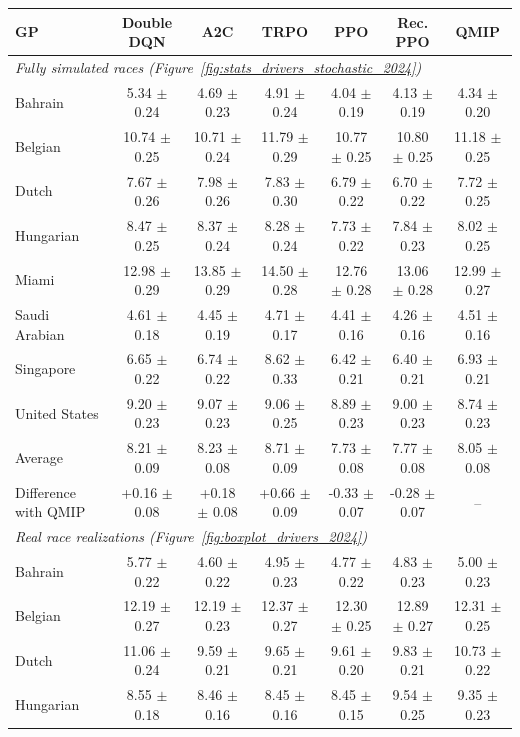 \begin{tabular}{lcccccc}
\toprule
GP & Double DQN & A2C & TRPO & PPO & Rec. PPO & QMIP \\
\midrule
\multicolumn{7}{l}{\textit{Fully simulated races (Figure~\ref{fig:stats_drivers_stochastic_2024})}} \\
\midrule
Bahrain & 5.34 $\pm$ 0.24 & 4.69 $\pm$ 0.23 & 4.91 $\pm$ 0.24 & 4.04 $\pm$ 0.19 & 4.13 $\pm$ 0.19 & 4.34 $\pm$ 0.20 \\
Belgian & 10.74 $\pm$ 0.25 & 10.71 $\pm$ 0.24 & 11.79 $\pm$ 0.29 & 10.77 $\pm$ 0.25 & 10.80 $\pm$ 0.25 & 11.18 $\pm$ 0.25 \\
Dutch & 7.67 $\pm$ 0.26 & 7.98 $\pm$ 0.26 & 7.83 $\pm$ 0.30 & 6.79 $\pm$ 0.22 & 6.70 $\pm$ 0.22 & 7.72 $\pm$ 0.25 \\
Hungarian & 8.47 $\pm$ 0.25 & 8.37 $\pm$ 0.24 & 8.28 $\pm$ 0.24 & 7.73 $\pm$ 0.22 & 7.84 $\pm$ 0.23 & 8.02 $\pm$ 0.25 \\
Miami & 12.98 $\pm$ 0.29 & 13.85 $\pm$ 0.29 & 14.50 $\pm$ 0.28 & 12.76 $\pm$ 0.28 & 13.06 $\pm$ 0.28 & 12.99 $\pm$ 0.27 \\
Saudi Arabian & 4.61 $\pm$ 0.18 & 4.45 $\pm$ 0.19 & 4.71 $\pm$ 0.17 & 4.41 $\pm$ 0.16 & 4.26 $\pm$ 0.16 & 4.51 $\pm$ 0.16 \\
Singapore & 6.65 $\pm$ 0.22 & 6.74 $\pm$ 0.22 & 8.62 $\pm$ 0.33 & 6.42 $\pm$ 0.21 & 6.40 $\pm$ 0.21 & 6.93 $\pm$ 0.21 \\
United States & 9.20 $\pm$ 0.23 & 9.07 $\pm$ 0.23 & 9.06 $\pm$ 0.25 & 8.89 $\pm$ 0.23 & 9.00 $\pm$ 0.23 & 8.74 $\pm$ 0.23 \\
\midrule
Average & 8.21 $\pm$ 0.09 & 8.23 $\pm$ 0.08 & 8.71 $\pm$ 0.09 & 7.73 $\pm$ 0.08 & 7.77 $\pm$ 0.08 & 8.05 $\pm$ 0.08 \\
Difference with QMIP & +0.16 $\pm$ 0.08 & +0.18 $\pm$ 0.08 & +0.66 $\pm$ 0.09 & -0.33 $\pm$ 0.07 & -0.28 $\pm$ 0.07 & -- \\
\midrule
\multicolumn{7}{l}{\textit{Real race realizations (Figure~\ref{fig:boxplot_drivers_2024})}} \\
\midrule
Bahrain & 5.77 $\pm$ 0.22 & 4.60 $\pm$ 0.22 & 4.95 $\pm$ 0.23 & 4.77 $\pm$ 0.22 & 4.83 $\pm$ 0.23 & 5.00 $\pm$ 0.23 \\
Belgian & 12.19 $\pm$ 0.27 & 12.19 $\pm$ 0.23 & 12.37 $\pm$ 0.27 & 12.30 $\pm$ 0.25 & 12.89 $\pm$ 0.27 & 12.31 $\pm$ 0.25 \\
Dutch & 11.06 $\pm$ 0.24 & 9.59 $\pm$ 0.21 & 9.65 $\pm$ 0.21 & 9.61 $\pm$ 0.20 & 9.83 $\pm$ 0.21 & 10.73 $\pm$ 0.22 \\
Hungarian & 8.55 $\pm$ 0.18 & 8.46 $\pm$ 0.16 & 8.45 $\pm$ 0.16 & 8.45 $\pm$ 0.15 & 9.54 $\pm$ 0.25 & 9.35 $\pm$ 0.23 \\

\end{tabular}
